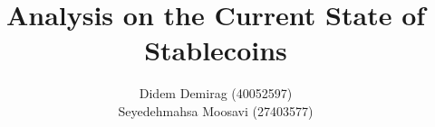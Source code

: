 \documentclass[envcountsect]{llncs}
\begin{document}
\frontmatter
\mainmatter

\title{Analysis on the Current State of Stablecoins}
\author{Didem Demirag (40052597) \\ Seyedehmahsa Moosavi (27403577)}




\maketitle













\end{document}
